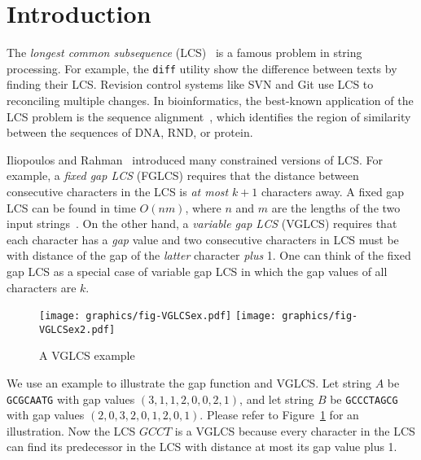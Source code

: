 \section{Introduction} %
\label{sec:Introduction}


The {\em longest common subsequence} (LCS)~\cite{Hirschberg1975ALS} is
a famous problem in string processing.  For example, the {\tt diff}
utility show the difference between texts by finding their LCS.
Revision control systems like SVN and Git use LCS to reconciling
multiple changes.  In bioinformatics, the best-known application of
the LCS problem is the sequence
alignment~\cite{mount2001bioinformatics, Ann2010EfficientAF}, which
identifies the region of similarity between the sequences of DNA, RND,
or protein.


\iffalse 最長共同子序列 (\emph{longest common subsequence}, LCS) 廣泛
地使用在各個應用上。在多核心平台下，大多數的研究專注於如何高效率地在波
前平行 (wavefront parallelism)，而 Jiaoyun Yang ~\cite{jiaoyun} 提出的
論文中改變一般的 LCS 遞迴定義以得到更好快取使用率。在這篇論文中，針對
在 Iliopoulos 和 Rahman ~\cite{iliopoulos} 提及的約束條件下的 LCS 問題
使用相關的想法來改善效能。\fi


Iliopoulos and Rahman~\cite{Rahman2006AlgorithmsFC} introduced many
constrained versions of LCS.  For example, a {\em fixed gap LCS}
(FGLCS) requires that the distance between consecutive characters in
the LCS is {\em at most} $k + 1$ characters away.  A fixed gap LCS can
be found in time $O(nm)$, where $n$ and $m$ are the lengths of the two
input strings~\cite{citation}.  On the other hand, a {\em variable gap
  LCS} (VGLCS) requires that each character has a {\em gap} value and
two consecutive characters in LCS must be with distance of the gap of
the {\em latter} character {\em plus} 1.  One can think of the fixed
gap LCS as a special case of variable gap LCS in which the gap values
of all characters are $k$.

\begin{figure}[!thb]
  \centering
  \texttt{[image: graphics/fig-VGLCSex.pdf]}
  \texttt{[image: graphics/fig-VGLCSex2.pdf]}
  \caption{A VGLCS example} \label{fig:VGLCSex}
\end{figure}

We use an example to illustrate the gap function and VGLCS.  Let string
$A$ be {\tt GCGCAATG} with gap values $(3, 1, 1, 2, 0, 0, 2, 1)$, and
let string $B$ be {\tt GCCCTAGCG} with gap values $(2, 0, 3, 2, 0, 1,
2, 0, 1)$.  Please refer to Figure~\ref{fig:VGLCSex} for an
illustration.  Now the LCS $GCCT$ is a VGLCS because every character
in the LCS can find its predecessor in the LCS with distance at most
its gap value plus 1.

